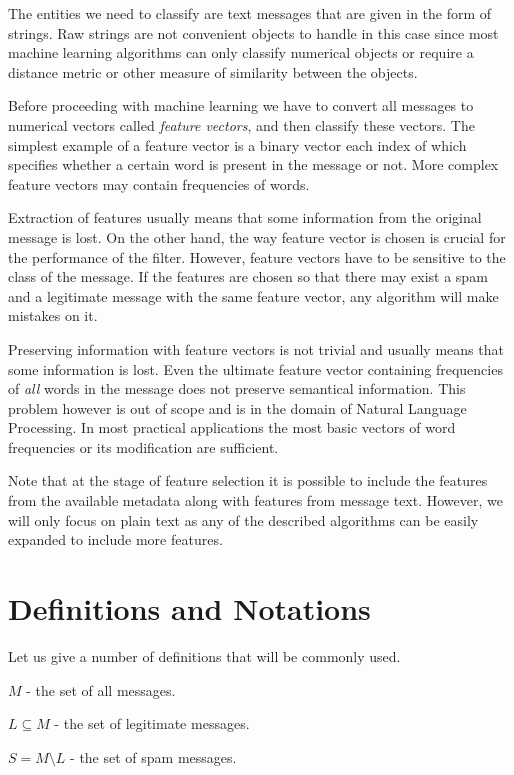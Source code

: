 \documentclass[12pt]{report}
\begin{document}
The entities we need to classify are text messages that are given in the form of strings. Raw strings are not convenient objects to handle in this case since most machine learning algorithms can only classify numerical objects or require a distance metric or other measure of similarity between the objects.

Before proceeding with machine learning we have to convert all messages to numerical vectors called \textit{feature vectors}, and then classify these vectors. The simplest example of a feature vector is a binary vector each index of which specifies whether a certain word is present in the message or not. More complex feature vectors may contain frequencies of words.

Extraction of features usually means that some information from the original message is lost. On the other hand, the way feature vector is chosen is crucial for the performance of the filter. However, feature vectors have to be sensitive to the class of the message. If the features are chosen so that there may exist a spam and a legitimate message with the same feature vector, any algorithm will make mistakes on it.

Preserving information with feature vectors is not trivial and usually means that some information is lost. Even the ultimate feature vector containing frequencies of \textit{all} words in the message does not preserve semantical information. This problem however is out of scope and is in the domain of Natural Language Processing. In most practical applications the most basic vectors of word frequencies or its modification are sufficient.

Note that at the stage of feature selection it is possible to include the features from the available metadata along with features from message text. However, we will only focus on plain text as any of the described algorithms can be easily expanded to include more features.

\newpage

\section{Definitions and Notations}

Let us give a number of definitions that will be commonly used.

$M$ - the set of all messages.

$L \subseteq M$ - the set of legitimate messages.

$S = M \setminus L$ - the set of spam messages.
\end{document}
